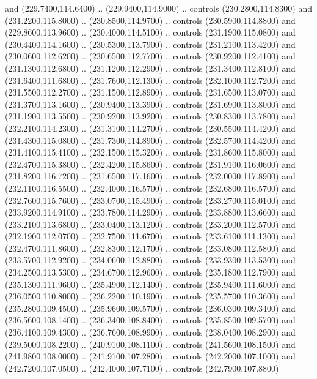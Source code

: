 {\begin{scope}[y=0.80pt, x=0.80pt, yscale=-1, xscale=1, inner sep=0pt, outer sep=0pt, #1]
      and (229.7400,114.6400) .. (229.9400,114.9000) .. controls (230.2800,114.8300)
      and (231.2200,115.8000) .. (230.8500,114.9700) .. controls (230.5900,114.8800)
      and (229.8600,113.9600) .. (230.4000,114.5100) .. controls (231.1900,115.0800)
      and (230.4400,114.1600) .. (230.5300,113.7900) .. controls (231.2100,113.4200)
      and (230.0600,112.6200) .. (230.6500,112.7700) .. controls (230.9200,112.4100)
      and (231.1300,112.6800) .. (231.1200,112.2900) .. controls (231.3400,112.8100)
      and (231.6400,111.6800) .. (231.7600,112.1300) .. controls (232.1000,112.7200)
      and (231.5500,112.2700) .. (231.1500,112.8900) .. controls (231.6500,113.0700)
      and (231.3700,113.1600) .. (230.9400,113.3900) .. controls (231.6900,113.8000)
      and (231.1900,113.5500) .. (230.9200,113.9200) .. controls (230.8300,113.7800)
      and (232.2100,114.2300) .. (231.3100,114.2700) .. controls (230.5500,114.4200)
      and (231.4300,115.0800) .. (231.7300,114.8900) .. controls (232.5700,114.4200)
      and (231.4100,115.4100) .. (232.1500,115.3200) .. controls (231.8600,115.8000)
      and (232.4700,115.3800) .. (232.4200,115.8600) .. controls (231.9100,116.0600)
      and (231.8200,116.7200) .. (231.6500,117.1600) .. controls (232.0000,117.8900)
      and (232.1100,116.5500) .. (232.4000,116.5700) .. controls (232.6800,116.5700)
      and (232.7600,115.7600) .. (233.0700,115.4900) .. controls (233.2700,115.0100)
      and (233.9200,114.9100) .. (233.7800,114.2900) .. controls (233.8800,113.6600)
      and (233.2100,113.6800) .. (233.0400,113.1200) .. controls (233.2000,112.5700)
      and (232.1900,112.0700) .. (232.7500,111.6700) .. controls (233.6100,111.1300)
      and (232.4700,111.8600) .. (232.8300,112.1700) .. controls (233.0800,112.5800)
      and (233.5700,112.9200) .. (234.0600,112.8800) .. controls (233.9300,113.5300)
      and (234.2500,113.5300) .. (234.6700,112.9600) .. controls (235.1800,112.7900)
      and (235.1300,111.9600) .. (235.4900,112.1400) .. controls (235.9400,111.6000)
      and (236.0500,110.8000) .. (236.2200,110.1900) .. controls (235.5700,110.3600)
      and (235.2800,109.4500) .. (235.9600,109.5700) .. controls (236.0300,109.3400)
      and (236.5600,108.1400) .. (236.3400,108.8400) .. controls (235.8500,109.5700)
      and (236.4100,109.4300) .. (236.7600,108.9900) .. controls (238.0400,108.2900)
      and (239.5000,108.2200) .. (240.9100,108.1100) .. controls (241.5600,108.1500)
      and (241.9800,108.0000) .. (241.9100,107.2800) .. controls (242.2000,107.1000)
      and (242.7200,107.0500) .. (242.4000,107.7100) .. controls (242.7900,107.8800)

\end{scope}}
